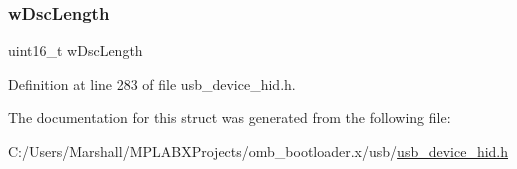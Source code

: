 \mbox{\label{struct___u_s_b___h_i_d___d_s_c___h_e_a_d_e_r_aba365ad44f648f09cd46a68dec863532}} 
\subsubsection{\texorpdfstring{wDscLength}{wDscLength}}
{\footnotesize\ttfamily uint16\+\_\+t w\+Dsc\+Length}



Definition at line 283 of file usb\+\_\+device\+\_\+hid.\+h.



The documentation for this struct was generated from the following file\+:\begin{DoxyCompactItemize}
\item 
C\+:/\+Users/\+Marshall/\+M\+P\+L\+A\+B\+X\+Projects/omb\+\_\+bootloader.\+x/usb/\mbox{\hyperlink{usb__device__hid_8h}{usb\+\_\+device\+\_\+hid.\+h}}\end{DoxyCompactItemize}
